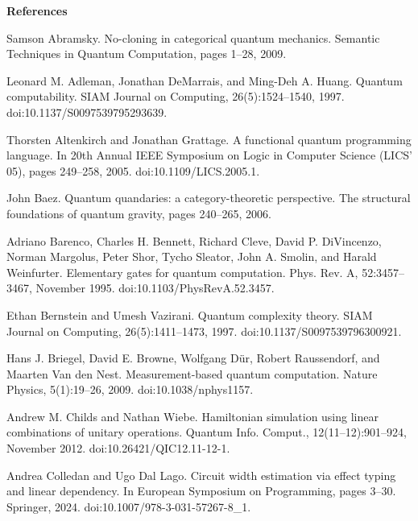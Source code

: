 
 
\par\medskip\noindent\textbf{References}\par
  
\par\noindent  [1]  Samson Abramsky.  No-cloning in categorical quantum mechanics.  Semantic Techniques in Quantum Computation, pages 1–28, 2009.  
 
\par\noindent  [2]  Leonard M. Adleman, Jonathan DeMarrais, and Ming-Deh A. Huang.  Quantum computability.  SIAM Journal on Computing, 26(5):1524–1540, 1997.  doi:10.1137/S0097539795293639.  
 
\par\noindent  [3]  Thorsten Altenkirch and Jonathan Grattage.  A functional quantum programming language.  In 20th Annual IEEE Symposium on Logic in Computer Science (LICS’ 05), pages 249–258, 2005.  doi:10.1109/LICS.2005.1.  
 
\par\noindent  [4]  John Baez.  Quantum quandaries: a category-theoretic perspective.  The structural foundations of quantum gravity, pages 240–265, 2006.  
 
\par\noindent  [5]  Adriano Barenco, Charles H. Bennett, Richard Cleve, David P. DiVincenzo, Norman Margolus, Peter Shor, Tycho Sleator, John A. Smolin, and Harald Weinfurter.  Elementary gates for quantum computation.  Phys. Rev. A, 52:3457–3467, November 1995.  doi:10.1103/PhysRevA.52.3457.  
 
\par\noindent  [6]  Ethan Bernstein and Umesh Vazirani.  Quantum complexity theory.  SIAM Journal on Computing, 26(5):1411–1473, 1997.  doi:10.1137/S0097539796300921.  
 
\par\noindent  [7]  Hans J. Briegel, David E. Browne, Wolfgang Dür, Robert Raussendorf, and Maarten Van den Nest.  Measurement-based quantum computation.  Nature Physics, 5(1):19–26, 2009.  doi:10.1038/nphys1157.  
 
\par\noindent  [8]  Andrew M. Childs and Nathan Wiebe.  Hamiltonian simulation using linear combinations of unitary operations.  Quantum Info. Comput., 12(11–12):901–924, November 2012.  doi:10.26421/QIC12.11-12-1.  
 
\par\noindent  [9]  Andrea Colledan and Ugo Dal Lago.  Circuit width estimation via effect typing and linear dependency.  In European Symposium on Programming, pages 3–30. Springer, 2024.  doi:10.1007/978-3-031-57267-8\_1.  
 
